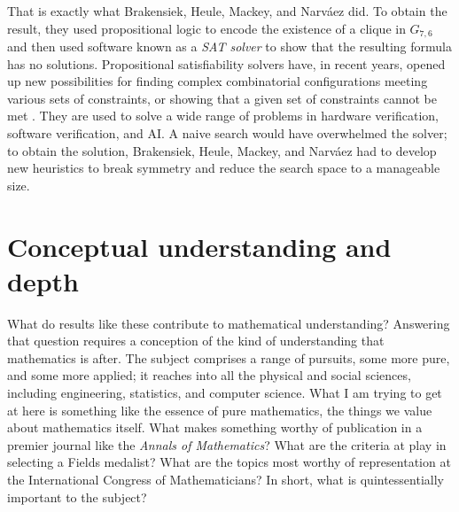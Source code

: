 \documentclass[12pt]{amsart}
\theoremstyle{definition}
\theoremstyle{remark}
\numberwithin{equation}{section}
\begin{document}
That is exactly what Brakensiek, Heule, Mackey, and Narv\'aez did. To obtain the result, they used propositional logic to encode the existence of a clique in $G_{7,6}$ and then used software known as a \emph{SAT solver} to show that the resulting formula has no solutions. Propositional satisfiability solvers have, in recent years, opened up new possibilities for finding complex combinatorial configurations meeting various sets of constraints, or showing that a given set of constraints cannot be met \cite{biere:et:al:09}. They are used to solve a wide range of problems in hardware verification, software verification, and AI. A naive search would have overwhelmed the solver; to obtain the solution, Brakensiek, Heule, Mackey, and Narv\'aez had to develop new heuristics to break symmetry and reduce the search space to a manageable size.

\section{Conceptual understanding and depth}
\label{section:understanding}

What do results like these contribute to mathematical understanding? Answering that question requires a conception of the kind of understanding that mathematics is after. The subject comprises a range of pursuits, some more pure, and some more applied; it reaches into all the physical and social sciences, including engineering, statistics, and computer science. What I am trying to get at here is something like the essence of pure mathematics, the things we value about mathematics itself. What makes something worthy of publication in a premier journal like the \emph{Annals of Mathematics}? What are the criteria at play in selecting a Fields medalist? What are the topics most worthy of representation at the International Congress of Mathematicians? In short, what is quintessentially important to the subject?
\end{document}
